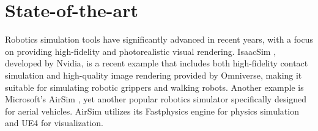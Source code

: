 \section{State-of-the-art} \label{sec:soa}



Robotics simulation tools have significantly advanced in recent years, with a focus on providing  high-fidelity and photorealistic visual rendering. IsaacSim \cite{simulator:isaacsim}, developed by Nvidia, is a recent example that includes both high-fidelity contact simulation and high-quality image rendering provided by Omniverse, making it suitable for simulating robotic grippers and walking robots. Another example is Microsoft's AirSim \cite{rw:shah2018airsim}, yet another popular robotics simulator specifically designed for aerial vehicles. AirSim utilizes its Fastphysics engine for physics simulation and \ac{UE4} for visualization.

